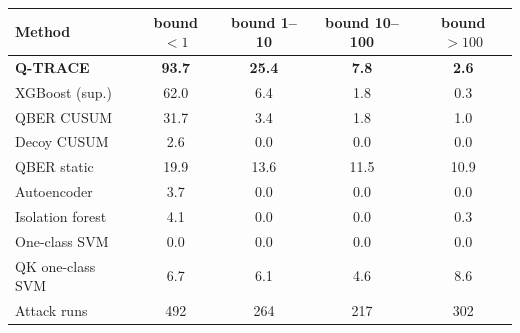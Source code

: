 \begin{tabular}{lcccc}
\toprule
Method & bound $<1$ & bound 1--10 & bound 10--100 & bound $>100$ \\
\midrule
\textbf{Q-TRACE} & \textbf{93.7} & \textbf{25.4} & \textbf{7.8} & \textbf{2.6} \\
XGBoost (sup.) & 62.0 & 6.4 & 1.8 & 0.3 \\
QBER CUSUM & 31.7 & 3.4 & 1.8 & 1.0 \\
Decoy CUSUM & 2.6 & 0.0 & 0.0 & 0.0 \\
QBER static & 19.9 & 13.6 & 11.5 & 10.9 \\
Autoencoder & 3.7 & 0.0 & 0.0 & 0.0 \\
Isolation forest & 4.1 & 0.0 & 0.0 & 0.3 \\
One-class SVM & 0.0 & 0.0 & 0.0 & 0.0 \\
QK one-class SVM & 6.7 & 6.1 & 4.6 & 8.6 \\
\midrule
Attack runs & 492 & 264 & 217 & 302 \\
\bottomrule
\end{tabular}

